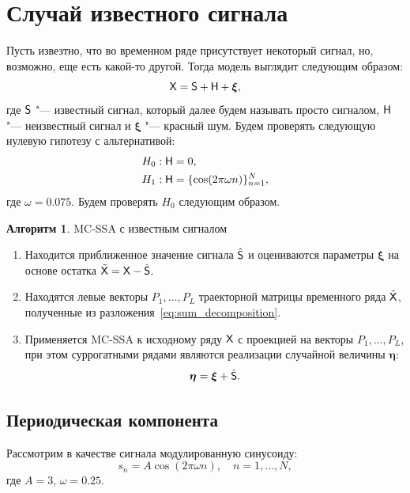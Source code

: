 \documentclass[specialist,
substylefile = spbu_report.rtx,
subf,href,colorlinks=true, 12pt]{disser}
\theoremstyle{definition}
\newtheorem{algorithm}{Алгоритм}
\begin{document}
\section{Случай известного сигнала}
Пусть извезтно, что во временном ряде присутствует некоторый сигнал, но, возможно, еще есть какой-то другой. Тогда модель выглядит следующим образом:
\[
\mathsf{X}=\mathsf{S} + \mathsf{H} + \boldsymbol{\xi},
\]
где $\mathsf{S}$ "--- известный сигнал, который далее будем называть просто сигналом, $\mathsf{H}$ "--- неизвестный сигнал и $\boldsymbol{\xi}$ "--- красный шум.
Будем проверять следующую нулевую гипотезу с альтернативой:
\begin{align*}
&H_0: \mathsf{H}=0,\\
&H_1: \mathsf{H} = \{\cos(2\pi\omega n)\}_{n=1}^N,
\end{align*}
где $\omega=0.075$.
Будем проверять $H_0$ следующим образом.
\begin{algorithm}{MC-SSA с известным сигналом}
\begin{enumerate}
	\item Находится приближенное значение сигнала $\hat{\mathsf{S}}$ и оцениваются параметры $\boldsymbol{\xi}$ на основе остатка $\tilde{\mathsf{X}}=\mathsf{X}-\hat{\mathsf{S}}$.
	\item Находятся левые векторы $P_1,\ldots,P_L$ траекторной матрицы временного ряда $\tilde{\mathsf{X}}$, полученные из разложения~\ref{eq:sum_decomposition}. 
	\item Применяется MC-SSA к исходному ряду $\mathsf{X}$ с проекцией на векторы $P_1,\ldots,P_L$, при этом суррогатными рядами являются реализации случайной величины $\boldsymbol{\eta}$:
	\[
	\boldsymbol{\eta} = \boldsymbol{\xi} + \hat{\mathsf{S}}.
	\]
\end{enumerate}
\end{algorithm}

\subsection{Периодическая компонента}
Рассмотрим в качестве сигнала модулированную синусоиду:
\[
s_n=A\cos(2\pi\omega n),\quad n=1,\ldots,N,
\]
где $A=3$, $\omega=0.25$.
\end{document}
